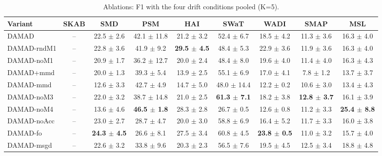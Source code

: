 \begin{table}[t]
\centering
\small
\caption{Ablations: F1 with the four drift conditions pooled (K=5).}
\label{tab:abl_f1}
\begin{tabular}{lcccccccc}
\toprule
Variant & SKAB & SMD & PSM & HAI & SWaT & WADI & SMAP & MSL \\
\midrule
DAMAD & – & 22.5 $\pm$ 2.6 & 42.1 $\pm$ 11.8 & 21.2 $\pm$ 3.2 & 52.4 $\pm$ 6.7 & 18.5 $\pm$ 4.2 & 11.3 $\pm$ 3.6 & 16.3 $\pm$ 4.0 \\
DAMAD-rndM1 & – & 22.8 $\pm$ 3.6 & 41.9 $\pm$ 9.2 & \textbf{29.5 $\pm$ 4.5} & 48.4 $\pm$ 5.3 & 22.9 $\pm$ 3.6 & 11.9 $\pm$ 3.6 & 16.3 $\pm$ 4.0 \\
DAMAD-noM1 & – & 20.9 $\pm$ 1.7 & 36.2 $\pm$ 12.7 & 20.0 $\pm$ 2.4 & 48.4 $\pm$ 8.0 & 19.6 $\pm$ 4.0 & 11.4 $\pm$ 4.0 & 16.3 $\pm$ 4.3 \\
DAMAD+mmd & – & 20.0 $\pm$ 1.3 & 39.3 $\pm$ 5.4 & 13.9 $\pm$ 2.5 & 55.1 $\pm$ 6.9 & 17.0 $\pm$ 4.1 & 7.8 $\pm$ 1.2 & 13.7 $\pm$ 3.7 \\
DAMAD-mmd & – & 12.6 $\pm$ 3.3 & 42.7 $\pm$ 4.9 & 14.7 $\pm$ 5.0 & 48.0 $\pm$ 14.4 & 12.2 $\pm$ 0.2 & 10.6 $\pm$ 3.0 & 13.4 $\pm$ 4.3 \\
DAMAD-noM3 & – & 22.0 $\pm$ 3.2 & 38.7 $\pm$ 14.8 & 21.0 $\pm$ 2.5 & \textbf{61.3 $\pm$ 7.1} & 18.2 $\pm$ 3.8 & \textbf{12.8 $\pm$ 3.7} & 16.1 $\pm$ 3.9 \\
DAMAD-noM4 & – & 13.6 $\pm$ 4.6 & \textbf{46.5 $\pm$ 1.8} & 28.3 $\pm$ 2.8 & 26.7 $\pm$ 0.5 & 12.6 $\pm$ 0.8 & 11.2 $\pm$ 3.3 & \textbf{25.4 $\pm$ 8.8} \\
DAMAD-noAcc & – & 23.0 $\pm$ 2.7 & 28.7 $\pm$ 4.7 & 20.0 $\pm$ 3.0 & 58.8 $\pm$ 6.9 & 16.4 $\pm$ 5.2 & 11.7 $\pm$ 3.3 & 16.0 $\pm$ 3.8 \\
DAMAD-fo & – & \textbf{24.3 $\pm$ 4.5} & 26.6 $\pm$ 8.1 & 27.5 $\pm$ 3.4 & 60.8 $\pm$ 4.5 & \textbf{23.8 $\pm$ 0.5} & 11.0 $\pm$ 3.2 & 15.7 $\pm$ 4.0 \\
DAMAD-msgd & – & 22.6 $\pm$ 3.2 & 33.8 $\pm$ 9.6 & 20.3 $\pm$ 2.3 & 56.5 $\pm$ 7.6 & 19.5 $\pm$ 4.5 & 12.5 $\pm$ 3.4 & 18.8 $\pm$ 4.8 \\
\bottomrule
\end{tabular}
\end{table}

